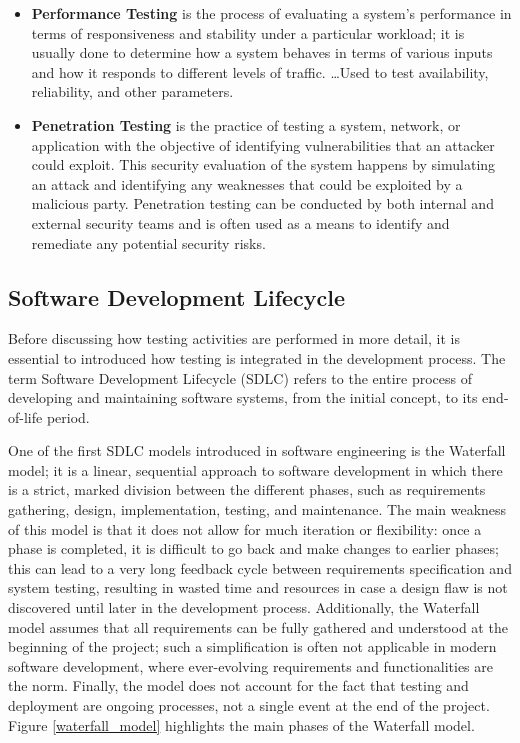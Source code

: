 \begin{itemize}
    \item \textbf{Performance Testing} is the process of evaluating a system's performance in terms of responsiveness and stability under a particular workload; it is usually done to determine how a system behaves in terms of various inputs and how it responds to different levels of traffic. \dots Used to test availability, reliability, and other parameters.
    \item \textbf{Penetration Testing} is the practice of testing a system, network, or application  with the objective of identifying vulnerabilities that an attacker could exploit. This security evaluation of the system happens by simulating an attack and identifying any weaknesses that could be exploited by a malicious party. Penetration testing can be conducted by both internal and external security teams and is often used as a means to identify and remediate any potential security risks.
\end{itemize}



\subsection{Software Development Lifecycle}
Before discussing how testing activities are performed in more detail, it is essential to introduced how testing is integrated in the development process. The term Software Development Lifecycle (SDLC) refers to the entire process of developing and maintaining software systems, from the initial concept, to its end-of-life period.

One of the first SDLC models introduced in software engineering is the Waterfall model; it is a linear, sequential approach to software development in which there is a strict, marked division between the different phases, such as requirements gathering, design, implementation, testing, and maintenance.
The main weakness of this model is that it does not allow for much iteration or flexibility: once a phase is completed, it is difficult to go back and make changes to earlier phases; this can lead to a very long feedback cycle between requirements specification and system testing, resulting in wasted time and resources in case a design flaw is not discovered until later in the development process. Additionally, the Waterfall model assumes that all requirements can be fully gathered and understood at the beginning of the project; such a simplification is often not applicable in modern software development, where ever-evolving requirements and functionalities are the norm. 
Finally, the model does not account for the fact that testing and deployment are ongoing processes, not a single event at the end of the project.
Figure \ref{waterfall_model} highlights the main phases of the Waterfall model.

